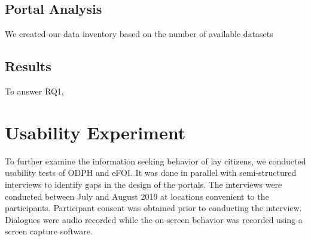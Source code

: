 \documentclass{sigchi}
\begin{document}
\subsection{Portal Analysis}
We created our data inventory based on the number of available datasets 

\begin{comment}
\textbf{Survey demographics}

data_work_ind_occupation    69
data_work_ind_parttime      12
data_work_ind_hobby         34
data_work_ind_passion       22
data_work_ind_curiosity     31
data_work_ind_other         25

1    39
0    27
2    24
3    21
4     4
5     3
6     2

student                               30
information-technology                21
business-consulting-and-management    15
others-generic                         9
accountancy-banking-and-finance        7
retired                                5
marketing-advertising-and-pr           4
creative-arts-and-design               4
engineering-and-manufacturing          3
healthcare                             3
public-services-and-administration     3
transport-and-logistics                2
charity-and-voluntary-work             2
property-and-construction              1
law-sector                             1
retail                                 1
teacher-training-and-education         1
sales                                  1

Woman                64
Man                  54
Prefer not to say     2

Woman                0.533333
Man                  0.450000
Prefer not to say    0.016667

< 20     7
20s     55
30s     29
40s      7
50s     11
60+     11

< 20    0.058333
20s     0.458333
30s     0.241667
40s     0.058333
50s     0.091667
60+     0.091667

87 have done some sort of data work (76.32\%)
\end{comment}

\subsection{Results}
To answer RQ1,


% 


\section{Usability Experiment}
To further examine the information seeking behavior of lay citizens, we conducted usability tests of ODPH and eFOI. It was done in parallel with semi-structured interviews to identify gaps in the design of the portals. The interviews were conducted between July and August 2019 at locations convenient to the participants. Participant consent was obtained prior to conducting the interview. Dialogues were audio recorded while the on-screen behavior was recorded using a screen capture software. 
\end{document}
